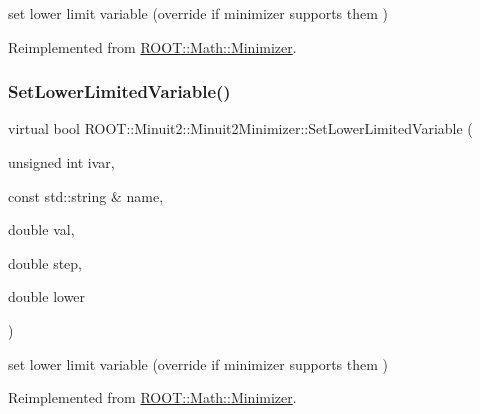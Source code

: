 set lower limit variable (override if minimizer supports them ) 



Reimplemented from \mbox{\hyperlink{classROOT_1_1Math_1_1Minimizer_a0fed20bdc58d05ce2b92d2bf47594dfb}{R\+O\+O\+T\+::\+Math\+::\+Minimizer}}.

\mbox{\label{classROOT_1_1Minuit2_1_1Minuit2Minimizer_af38926946e36f7030cfc1c298ab9b222}} 
\subsubsection{\texorpdfstring{SetLowerLimitedVariable()}{SetLowerLimitedVariable()}\hspace{0.1cm}{\footnotesize\ttfamily [2/2]}}
{\footnotesize\ttfamily virtual bool R\+O\+O\+T\+::\+Minuit2\+::\+Minuit2\+Minimizer\+::\+Set\+Lower\+Limited\+Variable (\begin{DoxyParamCaption}\item[{unsigned int}]{ivar,  }\item[{const std\+::string \&}]{name,  }\item[{double}]{val,  }\item[{double}]{step,  }\item[{double}]{lower }\end{DoxyParamCaption})\hspace{0.3cm}{\ttfamily [virtual]}}



set lower limit variable (override if minimizer supports them ) 



Reimplemented from \mbox{\hyperlink{classROOT_1_1Math_1_1Minimizer_a0fed20bdc58d05ce2b92d2bf47594dfb}{R\+O\+O\+T\+::\+Math\+::\+Minimizer}}.

\mbox{\label{classROOT_1_1Minuit2_1_1Minuit2Minimizer_acbb90c93015f5cf8e5ee99881a305019}} 
